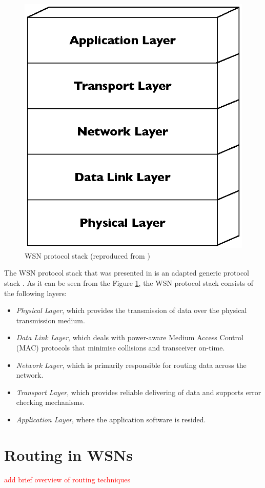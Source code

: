 \begin{figure}[h]
\centering
\includegraphics[scale=0.65]{img/ProtStack.eps}
\caption[WSN protocol stack]{WSN protocol stack (reproduced from \cite{SensorSurveyAkyildiz:2002})}
\label{Fig:ProtStack}
\end{figure}

The WSN protocol stack that was presented in \cite{SensorSurveyAkyildiz:2002}
is an adapted generic protocol stack \cite{ComputerNetworksTannenbaum:2003}. As
it can be seen from the Figure \ref{Fig:ProtStack}, the WSN protocol stack consists of the following layers:

\begin{itemize}
\item \emph{Physical Layer}, which provides the transmission of data over the physical transmission medium.
\item \emph{Data Link Layer}, which deals with power-aware Medium Access Control (MAC) protocols that minimise collisions and transceiver on-time.
\item \emph{Network Layer}, which is primarily responsible for
routing data across the network.
\item \emph{Transport Layer}, which provides reliable delivering of data and
supports error checking mechanisms.
\item \emph{Application Layer}, where the application software is resided.
\end{itemize}

\section {Routing in WSNs}
\textcolor{red}{add brief overview of routing techniques}